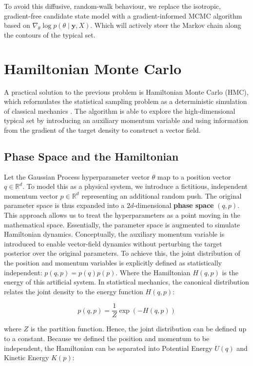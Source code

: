 \documentclass[12pt,oneside]{report}
\theoremstyle{definition}
\theoremstyle{remark}
\begin{document}
To avoid this diffusive, random-walk behaviour, we replace the isotropic, gradient-free candidate state model with a gradient-informed MCMC algorithm based on $\nabla_\theta \log p(\theta \mid \mathbf{y}, X)$. Which will actively steer the Markov chain along the contours of the typical set.

\section{Hamiltonian Monte Carlo}
A practical solution to the previous problem is Hamiltonian Monte Carlo (HMC), which reformulates the statistical sampling problem as a deterministic simulation of classical mechanics \cite{neal2011mcmc}. The algorithm is able to explore the high-dimensional typical set by introducing an auxiliary momentum variable and using information from the gradient of the target density to construct a vector field.

\subsection{Phase Space and the Hamiltonian}

Let the Gaussian Process hyperparameter vector $\theta$ map to a position vector $q \in \mathbb{R}^d$. To model this as a physical system, we introduce a fictitious, independent momentum vector $p \in \mathbb{R}^d$ representing an additional random push. The original parameter space is thus expanded into a $2d$-dimensional \textbf{phase space} $(q, p)$. This approach allows us to treat the hyperparameters as a point moving in the mathematical space. Essentially, the parameter space is augmented to simulate Hamiltonian dynamics. Conceptually, the auxiliary momentum variable is introduced to enable vector-field dynamics without perturbing the target posterior over the original parameters. To achieve this, the joint distribution of the position and momentum variables is explicitly defined as statistically independent: $p(q, p) = p(q)p(p)$. Where the Hamiltonian $H(q, p)$ is the energy of this artificial system. In statistical mechanics, the canonical distribution relates the joint density to the energy function $H(q, p)$:

$$p(q, p) = \frac{1}{Z} \exp(-H(q, p))$$

where $Z$ is the partition function. Hence, the joint distribution can be defined up to a constant. Because we defined the position and momentum to be independent, the Hamiltonian can be separated into Potential Energy $U(q)$ and Kinetic Energy $K(p)$:
\end{document}
